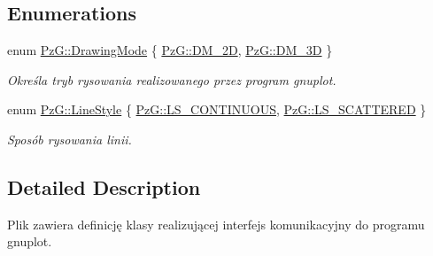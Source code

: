 \subsection*{Enumerations}
\begin{DoxyCompactItemize}
\item 
enum \hyperlink{namespace_pz_g_a4360c76a1dbf714a19a0d97fe56e0660}{Pz\+G\+::\+Drawing\+Mode} \{ \hyperlink{namespace_pz_g_a4360c76a1dbf714a19a0d97fe56e0660ac85b6f8146edb5ca2df8345dd86ef039}{Pz\+G\+::\+D\+M\+\_\+2D}, 
\hyperlink{namespace_pz_g_a4360c76a1dbf714a19a0d97fe56e0660aa7ef207217913b87d83fdf559d8368c7}{Pz\+G\+::\+D\+M\+\_\+3D}
 \}\begin{DoxyCompactList}\small\item\em Określa tryb rysowania realizowanego przez program {\ttfamily gnuplot}. \end{DoxyCompactList}
\item 
enum \hyperlink{namespace_pz_g_ab0580cdb6bfe9e51d7de2588bc824076}{Pz\+G\+::\+Line\+Style} \{ \hyperlink{namespace_pz_g_ab0580cdb6bfe9e51d7de2588bc824076af8f97c84dadf8eaa1f0370861e15dfec}{Pz\+G\+::\+L\+S\+\_\+\+C\+O\+N\+T\+I\+N\+U\+O\+US}, 
\hyperlink{namespace_pz_g_ab0580cdb6bfe9e51d7de2588bc824076a6495216b6a84a9fbe7141a687f9c03f1}{Pz\+G\+::\+L\+S\+\_\+\+S\+C\+A\+T\+T\+E\+R\+ED}
 \}\begin{DoxyCompactList}\small\item\em Sposób rysowania linii. \end{DoxyCompactList}
\end{DoxyCompactItemize}


\subsection{Detailed Description}
Plik zawiera definicję klasy realizującej interfejs komunikacyjny do programu gnuplot. 